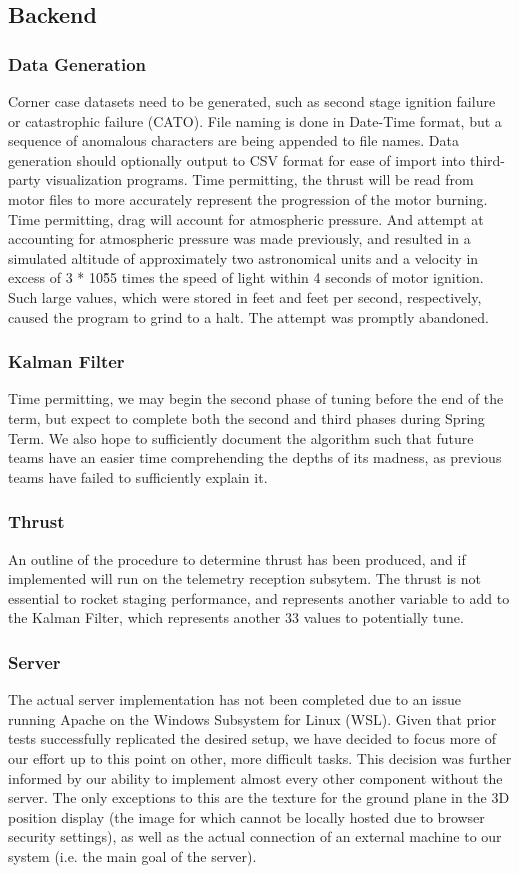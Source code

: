 \documentclass[journal,10pt,onecolumn,compsoc]{IEEEtran}
\begin{document}
	\subsection{Backend}
		\subsubsection{Data Generation}
			Corner case datasets need to be generated, such as second stage ignition failure or catastrophic failure (CATO).
			File naming is done in Date-Time format, but a sequence of anomalous characters are being appended to file names.
			Data generation should optionally output to CSV format for ease of import into third-party visualization programs.
			Time permitting, the thrust will be read from motor files to more accurately represent the progression of the motor burning.
			Time permitting, drag will account for atmospheric pressure.
			And attempt at accounting for atmospheric pressure was made previously, and resulted in a simulated altitude of approximately two astronomical units and a velocity in excess of 3 * 10\^55 times the speed of light within 4 seconds of motor ignition.
			Such large values, which were stored in feet and feet per second, respectively, caused the program to grind to a halt.
			The attempt was promptly abandoned.
		\subsubsection{Kalman Filter}
			Time permitting, we may begin the second phase of tuning before the end of the term, but expect to complete both the second and third phases during Spring Term.
			We also hope to sufficiently document the algorithm such that future teams have an easier time comprehending the depths of its madness, as previous teams have failed to sufficiently explain it.
		\subsubsection{Thrust}
			An outline of the procedure to determine thrust has been produced, and if implemented will run on the telemetry reception subsytem.
			The thrust is not essential to rocket staging performance, and represents another variable to add to the Kalman Filter, which represents another 33 values to potentially tune.
		\subsubsection{Server}
			The actual server implementation has not been completed due to an issue running Apache on the Windows Subsystem for Linux (WSL).
			Given that prior tests successfully replicated the desired setup, we have decided to focus more of our effort up to this point on other, more difficult tasks.
			This decision was further informed by our ability to implement almost every other component without the server.
			The only exceptions to this are the texture for the ground plane in the 3D position display (the image for which cannot be locally hosted due to browser security settings), as well as the actual connection of an external machine to our system (i.e. the main goal of the server).
\end{document}
